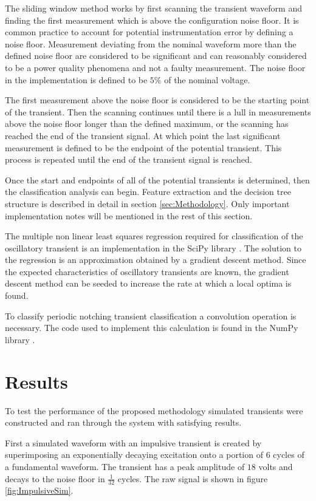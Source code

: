 \documentclass[10pt,conference,compsocconf]{IEEEtran}
\begin{document}
The sliding window method works by first scanning the transient waveform and finding the first measurement which is above the configuration noise floor. It is common practice to account for potential instrumentation error by defining a noise floor. Measurement deviating from the nominal waveform more than the defined noise floor are considered to be significant and can reasonably considered to be a power quality phenomena and not a faulty measurement. The noise floor in the implementation is defined to be $5\%$ of the nominal voltage. 

The first measurement above the noise floor is considered to be the starting point of the transient. Then the scanning continues until there is a lull in measurements above the noise floor longer than the defined maximum, or the scanning has reached the end of the transient signal. At which point the last significant measurement is defined to be the endpoint of the potential transient. This process is repeated until the end of the transient signal is reached.

Once the start and endpoints of all of the potential transients is determined, then the classification analysis can begin. Feature extraction and the decision tree structure is described in detail in section \ref{sec:Methodology}. Only important implementation notes will be mentioned in the rest of this section.

The multiple non linear least squares regression required for classification of the oscillatory transient is an implementation in the SciPy library \cite{scipy:2019}. The solution to the regression is an approximation obtained by a gradient descent method. Since the expected characteristics of oscillatory transients are known, the gradient descent method can be seeded to increase the rate at which a local optima is found.

To classify periodic notching transient classification a convolution operation is necessary. The code used to implement this calculation is found in the NumPy library \cite{numpy}. 

\section{Results}
\label{sec:Results}
To test the performance of the proposed methodology simulated transients were constructed and ran through the system with satisfying results. 

First a simulated waveform with an impulsive transient is created by superimposing an exponentially decaying excitation onto a portion of $6$ cycles of a fundamental waveform. The transient has a peak amplitude of $18$ volts and decays to the noise floor in $\frac{1}{32}$ cycles. The raw signal is shown in figure \ref{fig:ImpulsiveSim}.
\end{document}

